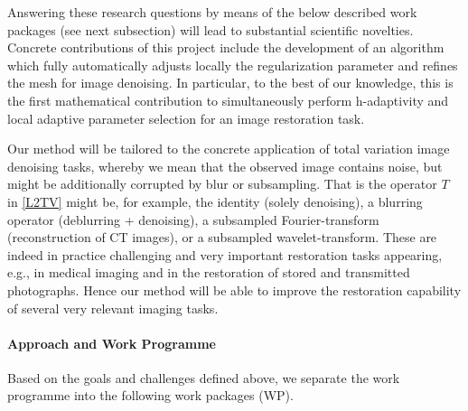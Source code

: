 \documentclass[enabledeprecatedfontcommands,cleardoublepage=empty,headsepline,twoside,11pt,DIV=15,BCOR=12mm,final]{scrartcl}
\begin{document}
Answering these research questions by means of the below described work packages (see next subsection) will lead to substantial scientific novelties. Concrete contributions of this project include the development of an algorithm which fully automatically adjusts locally the regularization parameter and refines the mesh for image denoising. In particular, to the best of our knowledge, this is the first mathematical contribution to simultaneously perform h-adaptivity and local adaptive parameter selection for an image restoration task.

Our method will be tailored to the concrete application of total variation image denoising tasks, whereby we mean that the observed image contains noise, but might be additionally corrupted by blur or subsampling. That is the operator $T$ in \eqref{L2TV} might be, for example, the identity (solely denoising), a blurring operator (deblurring + denoising), a subsampled Fourier-transform (reconstruction of CT images), or a subsampled wavelet-transform. These are indeed in practice challenging and very important restoration tasks appearing, e.g., in medical imaging and in the restoration of stored and transmitted photographs. Hence our method will be able to improve the restoration capability of several very relevant imaging tasks.


\paragraph{Approach and Work Programme}
 
 Based on the goals and challenges defined above, we separate the work programme into the following work packages (WP).
 
\end{document}
